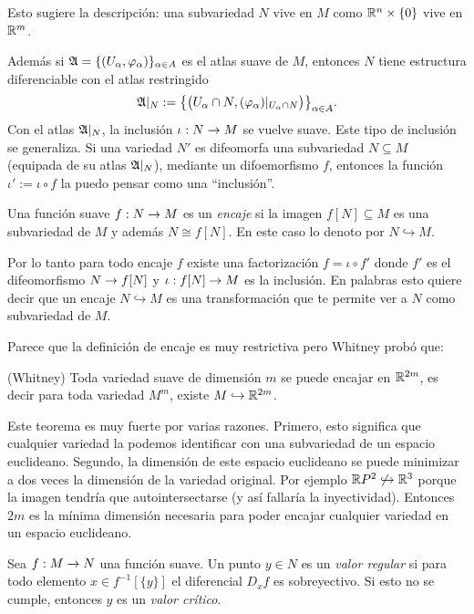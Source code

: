 \documentclass[../../topologia_algebraica]{subfiles}
\begin{document}
Esto sugiere la descripci\'on: una subvariedad $N$ vive en $M$ como
$\mathbb{R}^n\times\{0\}$ vive en $\mathbb{R}^m$.

Adem\'as si $\mathfrak{A}=\{(U_{\alpha},\varphi_{\alpha})\}_{\alpha\in A}$
es el atlas suave de $M$, entonces $N$ tiene estructura diferenciable con el atlas restringido
\[
  \mathfrak{A}|_N:=\big\{\big(U_{\alpha}\cap N,(\varphi_{\alpha})|_{U_{\alpha}\cap N}\big)\big\}_{\alpha\in A}.
\]
Con el atlas $\mathfrak{A}|_N$, la inclusi\'on $\iota:N\rightarrow M$ se vuelve suave. Este tipo de inclusi\'on
se generaliza. Si una variedad $N'$ es difeomorfa una subvariedad $N\subseteq M$ (equipada de
su atlas $\mathfrak{A}|_N$), mediante un difoemorfismo $f$, entonces la funci\'on $\iota':=\iota\circ f$
la puedo pensar como una ``inclusi\'on''.

\begin{defin}
  Una funci\'on suave $f:N\rightarrow M$ es un \emph{encaje} si la imagen $f[N]\subseteq M$ es una
  subvariedad de $M$ y adem\'as $N\cong f[N]$. En este caso lo denoto por $N\hookrightarrow M$.
\end{defin}

Por lo tanto para todo encaje $f$ existe una factorizaci\'on $f=\iota\circ f'$ donde $f'$ es el
difeomorfismo $N\rightarrow f[N]$ y $\iota:f[N]\rightarrow M$ es la inclusi\'on. En palabras esto quiere decir
que un encaje $N\hookrightarrow M$ es una transformaci\'on que te permite ver a $N$ como subvariedad
de $M$.

Parece que la definici\'on de encaje es muy restrictiva pero Whitney prob\'o que:

\begin{thm}(Whitney)
  Toda variedad suave de dimensi\'on $m$ se puede encajar en $\mathbb{R}^{2m}$, es decir para toda
  variedad $M^m$, existe $M\hookrightarrow \mathbb{R}^{2m}$.
\end{thm}

Este teorema es muy fuerte por varias razones. Primero, esto significa que cualquier variedad la
podemos identificar con una subvariedad de un espacio euclideano. Segundo, la dimensi\'on de este
espacio euclideano se puede minimizar a dos veces la dimensi\'on de la variedad original. Por ejemplo
$\mathbb{R} P^2\not\hookrightarrow\mathbb{R}^3$ porque la imagen tendr\'ia que autointersectarse (y as\'i
fallar\'ia la inyectividad). Entonces $2m$ es la m\'inima dimensi\'on necesaria para poder encajar
cualquier variedad en un espacio euclideano.

\begin{defin}
  Sea $f:M\rightarrow N$ una funci\'on suave. Un punto $y\in N$ es un \emph{valor regular} si para todo
  elemento $x\in f^{-1}[\{y\}]$ el diferencial $D_xf$ es sobreyectivo. Si esto no se cumple,
  entonces $y$ es un \emph{valor cr\'itico}.
\end{defin}
\end{document}
